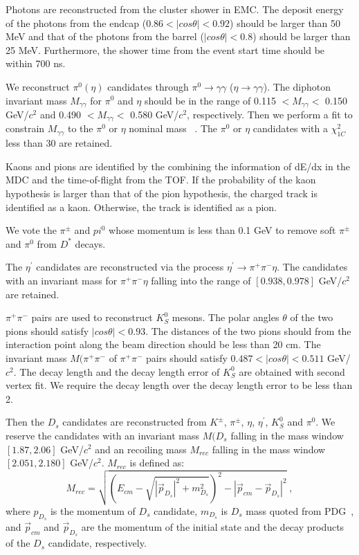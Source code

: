 \documentclass[aps,prd,twocolumn,showpacs,amsmath,amssymb]{revtex4-1}
\begin{document}
Photons are reconstructed from the cluster shower in EMC.
The deposit energy of the photons from the endcap ($0.86 < |cos\theta| < 0.92$) should be larger than 50 MeV and that of the photons from the barrel ($|cos\theta| < 0.8$) should be larger than 25 MeV.
Furthermore, the shower time from the event start time should be within 700 ns.

We reconstruct $\pi^{0} (\eta)$ candidates through $\pi^{0} \rightarrow \gamma\gamma$ ($\eta \rightarrow \gamma\gamma$).
The diphoton invariant mass $M_{\gamma\gamma}$ for $\pi^{0}$ and $\eta$ should be in the range of 0.115 $< M_{\gamma\gamma} <$ 0.150 GeV/$c^{2}$ and 0.490 $< M_{\gamma\gamma} <$ 0.580 GeV/$c^{2}$, respectively.
Then we perform a fit to constrain $M_{\gamma\gamma}$ to the $\pi^{0}$ or $\eta$ nominal mass ~\cite{PDG}.
The $\pi^{0}$ or $\eta$ candidates with a $\chi^{2}_{1C}$ less than 30 are retained.

Kaons and pions are identified by the combining the information of dE/dx in the MDC and the time-of-flight from the TOF.
If the probability of the kaon hypothesis is larger than that of the pion hypothesis, the charged track is identified as a kaon.
Otherwise, the track is identified as a pion.

We vote the $\pi^{\pm}$ and $pi^{0}$ whose momentum is less than 0.1 GeV to remove soft $\pi^{\pm}$ and $\pi^{0}$ from $D^{*}$ decays.

The $\eta^{'}$ candidates are reconstructed via the process $\eta^{'} \rightarrow \pi^{+}\pi^{-}\eta$.
The candidates with an invariant mass for $\pi^{+}\pi^{-}\eta$ falling into the range of $[0.938, 0.978]$ GeV/$c^{2}$ are retained.

$\pi^{+}\pi^{-}$ pairs are used to reconstruct $K_{S}^{0}$ mesons.
The polar angles $\theta$ of the two pions should satisfy $|cos\theta| < 0.93$.
The distances of the two pions should from the interaction point along the beam direction should be less than 20 cm. 
The invariant mass $M(\pi^{+}\pi^{-}$ of $\pi^{+}\pi^{-}$ pairs  should satisfy $0.487 < |cos\theta| < 0.511$ GeV/$c^{2}$.
The decay length and the decay length error of $K_{S}^{0}$ are obtained with second vertex fit.
We require the decay length over the decay length error to be less than 2.

Then the $D_{s}$ candidates are reconstructed from $K^{\pm}$, $\pi^{\pm}$, $\eta$, $\eta^{'}$, $K_{S}^{0}$ and $\pi^{0}$.
We reserve the candidates with an invariant mass $M(D_{s}$ falling in the mass window $[1.87, 2.06]$ GeV/$c^{2}$ and an recoiling mass $M_{rec}$ falling in the mass window $[2.051, 2.180]$ GeV/$c^{2}$.
$M_{rec}$ is defined as:
\begin{equation}
    M_{rec} = \sqrt{(E_{cm} - \sqrt{| \vec p_{D_{s}} |^{2} + m_{D_{s}}^{2}})^{2} - |\vec p_{cm} - \vec p_{D_{s}} | ^{2}} \; , \label{con:inventoryflow}
\end{equation}
where $p_{D_{s}}$ is the momentum of $D_{s}$ candidate, $m_{D_{s}}$ is $D_{s}$ mass quoted from PDG~\cite{PDG},
and $\vec p_{cm}$ and $\vec p_{D_{s}}$ are the momentum of the initial state and the decay products of the $D_{s}$ candidate, respectively. 
\end{document}
